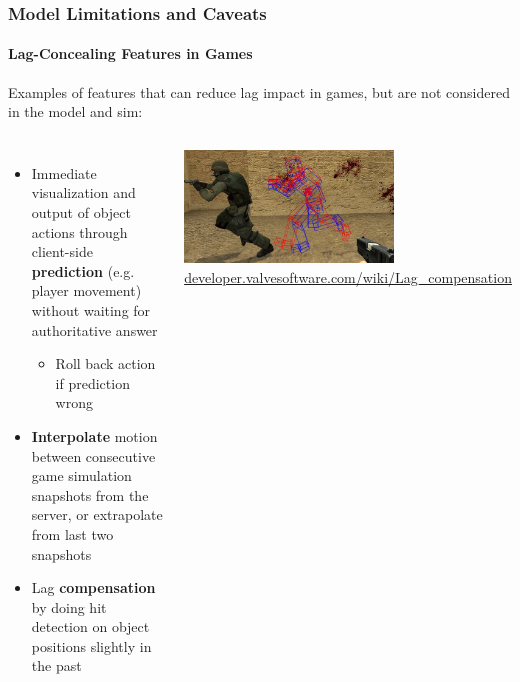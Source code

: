 \documentclass{UDEbeamerEN}
\begin{document}
\begin{frame}
	\frametitle{Model Limitations and Caveats}
	\framesubtitle{Lag-Concealing Features in Games}

	Examples of features that can reduce lag impact in games, but are not considered in the model and sim:

	\begin{columns}[T]
			\begin{itemize}
				\item Immediate visualization and output  of object actions through client-side \textbf{prediction} (e.g. player movement) without waiting for authoritative answer
				\begin{itemize}
					\item Roll back action if prediction wrong
				\end{itemize}

				\item \textbf{Interpolate} motion between consecutive game simulation snapshots from the server, or extrapolate from last two snapshots

				\item Lag \textbf{compensation} by doing hit detection on object positions slightly in the past
			\end{itemize}
			\includegraphics[height=3cm]{Lag_compensation.jpg}\\
			{\tiny\url{developer.valvesoftware.com/wiki/Lag_compensation}}
	\end{columns}

\end{frame}
\end{document}
